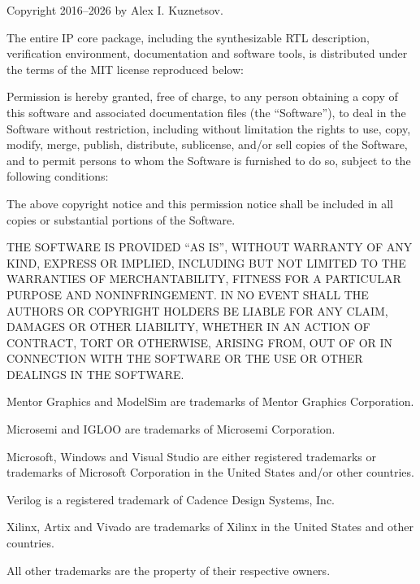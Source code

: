 {
\small
\setlength{\parindent}{0pt}
\nonzeroparskip

\vspace*{\fill}

Copyright \textcopyright{} 2016--2026 by Alex I. Kuznetsov.

The entire \lxp{} IP core package, including the synthesizable RTL description, verification environment, documentation and software tools, is distributed under the terms of the MIT license reproduced below:

Permission is hereby granted, free of charge, to any person obtaining a copy of this software and associated documentation files (the ``Software''), to deal in the Software without restriction, including without limitation the rights to use, copy, modify, merge, publish, distribute, sublicense, and/or sell copies of the Software, and to permit persons to whom the Software is furnished to do so, subject to the following conditions:

The above copyright notice and this permission notice shall be included in all copies or substantial portions of the Software.

THE SOFTWARE IS PROVIDED ``AS IS'', WITHOUT WARRANTY OF ANY KIND, EXPRESS OR IMPLIED, INCLUDING BUT NOT LIMITED TO THE WARRANTIES OF MERCHANTABILITY, FITNESS FOR A PARTICULAR PURPOSE AND NONINFRINGEMENT. IN NO EVENT SHALL THE AUTHORS OR COPYRIGHT HOLDERS BE LIABLE FOR ANY CLAIM, DAMAGES OR OTHER LIABILITY, WHETHER IN AN ACTION OF CONTRACT, TORT OR OTHERWISE, ARISING FROM, OUT OF OR IN CONNECTION WITH THE SOFTWARE OR THE USE OR OTHER DEALINGS IN THE SOFTWARE.

\vspace{4\baselineskip}

Mentor Graphics and ModelSim are trademarks of Mentor Graphics Corporation.

Microsemi and IGLOO are trademarks of Microsemi Corporation.

Microsoft, Windows and Visual Studio are either registered trademarks or trademarks of Microsoft Corporation in the United States and/or other countries.

Verilog is a registered trademark of Cadence Design Systems, Inc.

Xilinx, Artix and Vivado are trademarks of Xilinx in the United States and other countries.

All other trademarks are the property of their respective owners.
}

\cleardoublepage



\tableofcontents*
